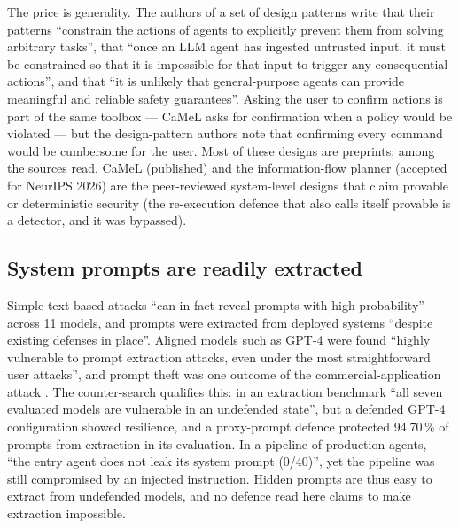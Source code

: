 The price is generality. The authors of a set of design patterns write
that their patterns \enquote{constrain the actions of agents to
explicitly prevent them from solving arbitrary tasks}, that \enquote{once
an LLM agent has ingested untrusted input, it must be constrained so that
it is impossible for that input to trigger any consequential actions},
and that \enquote{it is unlikely that general-purpose agents can provide
meaningful and reliable safety guarantees}\autocite{BeurerKellner2025Patterns}.
Asking the user to confirm actions is part of the same toolbox --- CaMeL
asks for confirmation when a policy would be
violated\autocite{Debenedetti2026CaMeL} --- but the design-pattern
authors note that confirming every command would be cumbersome for the
user\autocite{BeurerKellner2025Patterns}. Most of these designs are
preprints; among the sources read, CaMeL (published) and the
information-flow planner (accepted for NeurIPS 2026) are the peer-reviewed
system-level designs that claim provable or deterministic security (the
re-execution defence that also calls itself provable is a detector, and it
was bypassed).

\subsection{System prompts are readily extracted}

Simple text-based attacks \enquote{can in fact reveal prompts with high
probability} across 11 models, and prompts were extracted from deployed
systems \enquote{despite existing defenses in
place}\autocite{Zhang2024Extraction}. Aligned models such as GPT-4 were
found \enquote{highly vulnerable to prompt extraction attacks, even under
the most straightforward user attacks}\autocite{Liang2024Leaked}, and
prompt theft was one outcome of the commercial-application attack
\autocite{Liu2023HouYi}. The counter-search qualifies this: in an
extraction benchmark \enquote{all seven evaluated models are vulnerable in
an undefended state}, but a defended GPT-4 configuration showed
resilience\autocite{Wang2024Raccoon}, and a proxy-prompt defence
protected 94.70\,\% of prompts from extraction in its
evaluation\autocite{Zhuang2026ProxyPrompt}. In a pipeline of production agents, \enquote{the entry agent does not
leak its system prompt (0/40)}, yet the pipeline was still compromised by
an injected instruction\autocite{Sidot2026Verify}. Hidden prompts are thus
easy to extract from undefended models, and no defence read here claims to
make extraction impossible.


